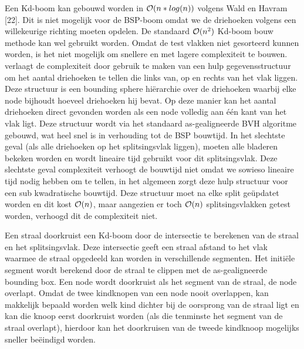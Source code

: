 Een Kd-boom kan gebouwd worden in $\mathcal{O}(n*log(n))$ volgens Wald en Havram [22].
Dit is niet mogelijk voor de BSP-boom omdat we de driehoeken volgens een willekeurige richting moeten opdelen.
De standaard $\mathcal{O}(n^2)$ Kd-boom bouw methode kan wel gebruikt worden.
Omdat de test vlakken niet gesorteerd kunnen worden, is het niet mogelijk om snellere en met lagere complexiteit te bouwen.
\authorIze{ }verlaagt de complexiteit door gebruik te maken van een hulp gegevensstructuur om het aantal driehoeken te tellen die links van, op en rechts van het vlak liggen.
Deze structuur is een bounding sphere hiërarchie over de driehoeken waarbij elke node bijhoudt hoeveel driehoeken hij bevat. 
Op deze manier kan het aantal driehoeken direct gevonden worden als een node volledig aan één kant van het vlak ligt.
Deze structuur wordt via het standaard as-gealigneerde BVH algoritme gebouwd, wat heel snel is in verhouding tot de BSP bouwtijd.
In het slechtste geval (als alle driehoeken op het splitsingsvlak liggen), moeten alle bladeren bekeken worden en wordt lineaire tijd gebruikt voor dit splitsingsvlak. 
Deze slechtste geval complexiteit verhoogt de bouwtijd niet omdat we sowieso lineaire tijd nodig hebben om te tellen, in het algemeen zorgt deze hulp structuur voor een sub kwadratische bouwtijd.
Deze structuur moet na elke split geüpdatet worden en dit kost $\mathcal{O}(n)$, maar aangezien er toch $\mathcal{O}(n)$ splitsingsvlakken getest worden, verhoogd dit de complexiteit niet. 

Een straal doorkruist een Kd-boom door de intersectie te berekenen van de straal en het splitsingsvlak.  
Deze intersectie geeft een straal afstand to het vlak waarmee de straal opgedeeld kan worden in verschillende segmenten.
Het initiële segment wordt berekend door de straal te clippen met de as-gealigneerde bounding box. 
Een node wordt doorkruist als het segment van de straal, de node overlapt.
Omdat de twee kindknopen van een node nooit overlappen, kan makkelijk bepaald worden welk kind dichter bij de oorsprong van de straal ligt en kan die knoop eerst doorkruist worden (als die tenminste het segment van de straal overlapt), hierdoor kan het doorkruisen van de tweede kindknoop mogelijks sneller beëindigd worden. 


